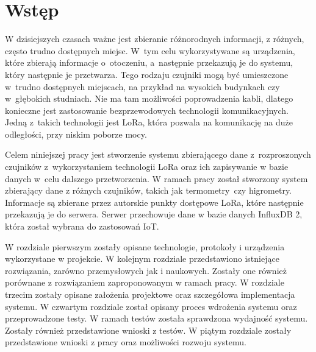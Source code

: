 
\chapter*{Wstęp} %
W dzisiejszych czasach ważne jest zbieranie różnorodnych informacji, z różnych, często trudno dostępnych miejsc. W~tym celu wykorzystywane są urządzenia, które zbierają informacje o~otoczeniu, a~następnie przekazują je do systemu, który następnie je przetwarza. Tego rodzaju czujniki mogą być umieszczone w~trudno dostępnych miejscach, na przykład na wysokich budynkach czy w~głębokich studniach. Nie ma tam możliwości poprowadzenia kabli, dlatego konieczne jest zastosowanie bezprzewodowych technologii komunikacyjnych. Jedną z~takich technologii jest LoRa, która pozwala na komunikację na duże odległości, przy niskim poborze mocy.

Celem niniejszej pracy jest stworzenie systemu zbierającego dane z~rozproszonych czujników z~wykorzystaniem technologii LoRa oraz ich zapisywanie w bazie danych w~celu dalszego przetworzenia.
W ramach pracy został stworzony system zbierający dane z różnych czujników, takich jak termometry~czy higrometry.
Informacje są zbierane przez autorskie punkty dostępowe LoRa, które następnie przekazują je do serwera.
Serwer przechowuje dane w bazie danych InfluxDB 2, która został wybrana do zastosowań IoT.

W rozdziale pierwszym zostały opisane technologie, protokoły i urządzenia wykorzystane w projekcie.
W kolejnym rozdziale przedstawiono istniejące rozwiązania, zarówno przemysłowych jak i naukowych. Zostały one również porównane z rozwiązaniem zaproponowanym w ramach pracy.
W rozdziale trzecim zostały opisane założenia projektowe oraz szczegółowa implementacja systemu.
W czwartym rozdziale został opisany proces wdrożenia systemu oraz przeprowadzone testy. W ramach testów została sprawdzona wydajność systemu. Zostały również przedstawione wnioski z testów.
W piątym rozdziale zostały przedstawione wnioski z pracy oraz możliwości rozwoju systemu.
